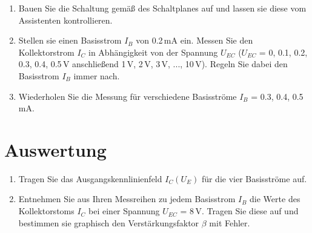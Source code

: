 \begin{enumerate}
	\item Bauen Sie die Schaltung gemäß des Schaltplanes auf und lassen sie diese vom Assistenten kontrollieren.
	\item Stellen sie einen Basisstrom $I_B$ von 0.2\,mA ein. Messen Sie den Kollektorstrom $I_C$ in Abhängigkeit von der Spannung $U_{EC}$ ($U_{EC}$ = 0, 0.1, 0.2, 0.3, 0.4, 0.5\,V anschließend 1\,V, 2\,V, 3\,V, ..., 10\,V).
		Regeln Sie dabei den Basisstrom $I_B$ immer nach.
	\item Wiederholen Sie die Messung für verschiedene Basisströme $I_B$ = 0.3, 0.4, 0.5\,mA.
\end{enumerate}

\section{Auswertung} 

\begin{enumerate}
	\item Tragen Sie das Ausgangskennlinienfeld $I_C (U_E)$ für die vier Basisströme auf.
	\item Entnehmen Sie aus Ihren Messreihen zu jedem Basisstrom $I_B$ die Werte des Kollektorstoms $I_C$ bei einer Spannung $U_{EC}$ = 8\,V. Tragen Sie diese auf und bestimmen sie graphisch den Verstärkungsfaktor $\beta$ mit Fehler.
\end{enumerate}